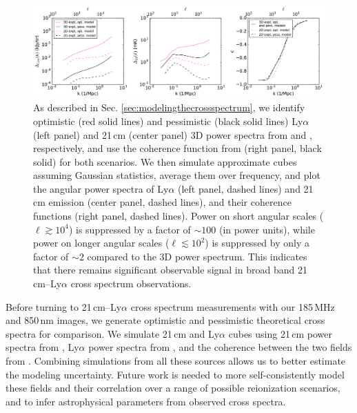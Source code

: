 \documentclass[numberedappendix]{emulateapj}
\providecommand{\DIFdelbegin}{} %
\providecommand{\DIFdelend}{} %
\begin{document}
\begin{figure}[h]
\centering
\includegraphics[width=7in]{spectra3D_to_2D.pdf}
\caption[Study of the relationship between power spectra recovered from 2D and 3D surveys, both for 21\,cm and 850\,nm cubes.]{As described in Sec. \ref{sec:modelingthecrossspectrum}, we identify optimistic (red solid lines) and pessimistic (black solid lines) Ly$\alpha$ (left panel) and 21\,cm (center panel) 3D power spectra from \citet{Gong2014} and \citet{PoberNextGen, 21cmfast}, respectively, and use the coherence function from \citet{Heneka2016} (right panel, black solid) for both scenarios. We then simulate approximate cubes assuming Gaussian statistics, average them over frequency, and plot the angular power spectra of Ly$\alpha$ (left panel, dashed lines) and 21\,cm emission (center panel, dashed lines), and their coherence functions (right panel, dashed lines). Power on short angular scales ($\ell\gtrsim10^4$) is suppressed by a factor of $\sim100$ (in power units), while power on longer angular scales ($\ell\lesssim10^2$) is suppressed by only a factor of $\sim2$ compared to the 3D power spectrum. This indicates that there remains significant observable signal in broad band 21\,cm--Ly$\alpha$ cross spectrum observations. }
\label{fig:spectra3Dto2D}
\end{figure}

Before turning to 21\,cm--Ly$\alpha$ cross spectrum measurements with our 185\,MHz and 850\,nm images, we generate optimistic and pessimistic theoretical cross spectra for comparison. We simulate 21\,cm and Ly$\alpha$ cubes using 21\,cm power spectra from \citet{PoberNextGen}\DIFdelbegin %
\DIFdelend , Ly$\alpha$ power spectra from \citet{Gong2014}, and the coherence between the two fields from \citet{Heneka2016}. Combining simulations from all these sources allows us to better estimate the modeling uncertainty. Future work is needed to more self-consistently model these fields and their correlation over a range of possible reionization scenarios, and to infer astrophysical parameters from observed cross spectra.
\end{document}
